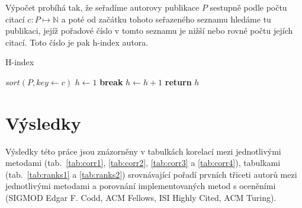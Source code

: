 \documentclass{bakalarka}
\begin{document}
Výpočet probíhá tak, že seřadíme autorovy publikace $P$ sestupně podle počtu
citací $c: P \mapsto \mathbb{N}$ a poté od začátku tohoto seřazeného seznamu
hledáme tu publikaci, jejíž pořadové číslo v tomto seznamu je nižší nebo rovné
počtu jejích citací. Toto číslo je pak h-index autora.
\begin{center}
\begin{minipage}{\textwidth}
\begin{algorithm}[H]
	\caption{H-index}
		\label{alg:hindex}

	\begin{algorithmic}[1]
	\Statex
		\State $sort(P, key \gets c)$
		\State $h \gets 1$
				\State \textbf{break}
			\EndIf
			\State $h \gets h + 1$
		\EndFor
		\State \textbf{return} $h$
	\EndFunction
	\end{algorithmic}
\end{algorithm}
\end{minipage}
\end{center}
\mbox{}








\chapter{Výsledky}
Výsledky této práce jsou znázorněny v tabulkách korelací mezi jednotlivými
metodami (tab.~\ref{tab:corr1}, \ref{tab:corr2}, \ref{tab:corr3} a
\ref{tab:corr4}), tabulkami (tab.~\ref{tab:ranks1} a \ref{tab:ranks2})
srovnávající pořadí prvních třiceti autorů mezi jednotlivými metodami a
porovnání implementovaných metod s oceněními (SIGMOD Edgar F. Codd, ACM
Fellows, ISI Highly Cited, ACM Turing).
\end{document}
